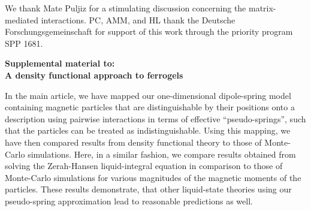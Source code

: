 \documentclass[aps,pre,twocolumn,superscriptaddress,nofootinbib]{revtex4}
\begin{document}
\begin{acknowledgments}
We thank Mate Puljiz for a stimulating discussion concerning the matrix-mediated interactions.
PC, AMM, and HL thank the Deutsche Forschungsgemeinschaft for support of this work through the priority program SPP 1681. 
\end{acknowledgments}



\onecolumngrid
\clearpage
\begin{center}
\textbf{\large Supplemental material to: \\ A density functional approach to ferrogels}
\vspace{1.0\baselineskip}
\thispagestyle{empty}

\begin{minipage}{0.11\columnwidth}
\end{minipage}
\begin{minipage}{0.78\columnwidth}
\small

\indent In the main article, we have mapped our one-dimensional dipole-spring model containing magnetic particles that are distinguishable by their positions onto a description using pairwise interactions in terms of effective ``pseudo-springs'', such that the particles can be treated as indistinguishable.
Using this mapping, we have then compared results from density functional theory to those of Monte-Carlo simulations. 
Here, in a similar fashion, we compare results obtained from solving the Zerah-Hansen liquid-integral equation in comparison to those of Monte-Carlo simulations for various magnitudes of the magnetic moments of the particles. 
These results demonstrate, that other liquid-state theories using our pseudo-spring approximation lead to reasonable predictions as well. 
\end{minipage}
\begin{minipage}{0.11\columnwidth}
\end{minipage}
\vspace{1.0\baselineskip}

\end{center}

\twocolumngrid
\end{document}
